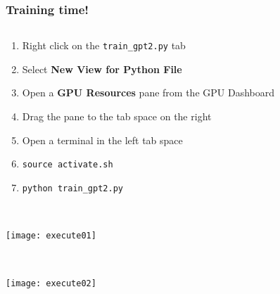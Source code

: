 \documentclass[
	notes=none,
	aspectratio=169
]{beamer}
\begin{document}

\begin{frame}
\frametitle{Training time!}

\begin{columns}[T]
\begin{column}[T]{1.0\textwidth}
\setlength{\parskip}{0.5em}

\vspace{0.0cm}
\begin{enumerate}
\setlength{\parskip}{0.5em}
\item Right click on the {\tt train\_gpt2.py} tab
\item Select {\bf New View for Python File}
\item Open a {\bf GPU Resources} pane from the GPU Dashboard
\item Drag the pane to the tab space on the right
\item Open a terminal in the left tab space
\item {\tt source activate.sh}
\item {\tt python train\_gpt2.py}
\end{enumerate}

\end{column}
\end{columns}

\end{frame}
\note{
}


\begin{frame}
\frametitle{}

\begin{columns}[T]
\begin{column}[T]{1.0\textwidth}
\setlength{\parskip}{0.5em}

\vspace{0.0cm}
\texttt{[image: execute01]}


\end{column}
\end{columns}

\end{frame}
\note{
}


\begin{frame}
\frametitle{}

\begin{columns}[T]
\begin{column}[T]{1.0\textwidth}
\setlength{\parskip}{0.5em}

\vspace{0.0cm}
\texttt{[image: execute02]}


\end{column}
\end{columns}

\end{frame}
\note{
}
\end{document}

